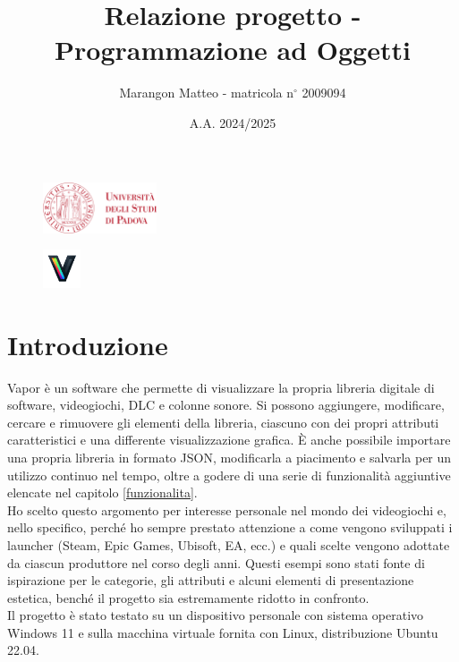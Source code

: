 \documentclass[10pt]{article}
\title{Relazione progetto - Programmazione ad Oggetti}
\author{Marangon Matteo - matricola n$^{\circ}$ 2009094}
\date{A.A. 2024/2025}
\begin{document}
\begin{figure}
    \centering
    \includegraphics[width=0.3\textwidth]{./unipdlogo.png}
\end{figure}
\maketitle

\newpage

\begin{figure} [h]
    \centering
    \includegraphics[width=0.1\textwidth]{./vaporlogo.png}
\end{figure}
\section{Introduzione} %
Vapor è un software che permette di visualizzare la propria libreria digitale di software, videogiochi, DLC e colonne sonore. Si possono aggiungere, modificare, cercare e rimuovere gli elementi della libreria, ciascuno con dei propri attributi caratteristici e una differente visualizzazione grafica. È anche possibile importare una propria libreria in formato JSON, modificarla a piacimento e salvarla per un utilizzo continuo nel tempo, oltre a godere di una serie di funzionalità aggiuntive elencate nel capitolo \ref{funzionalita}.
\\Ho scelto questo argomento per interesse personale nel mondo dei videogiochi e, nello specifico, perché ho sempre prestato attenzione a come vengono sviluppati i launcher (Steam, Epic Games, Ubisoft, EA, ecc.) e quali scelte vengono adottate da ciascun produttore nel corso degli anni. Questi esempi sono stati fonte di ispirazione per le categorie, gli attributi e alcuni elementi di presentazione estetica, benché il progetto sia estremamente ridotto in confronto.
\\Il progetto è stato testato su un dispositivo personale con sistema operativo Windows 11 e sulla macchina virtuale fornita con Linux, distribuzione Ubuntu 22.04.
\end{document}
